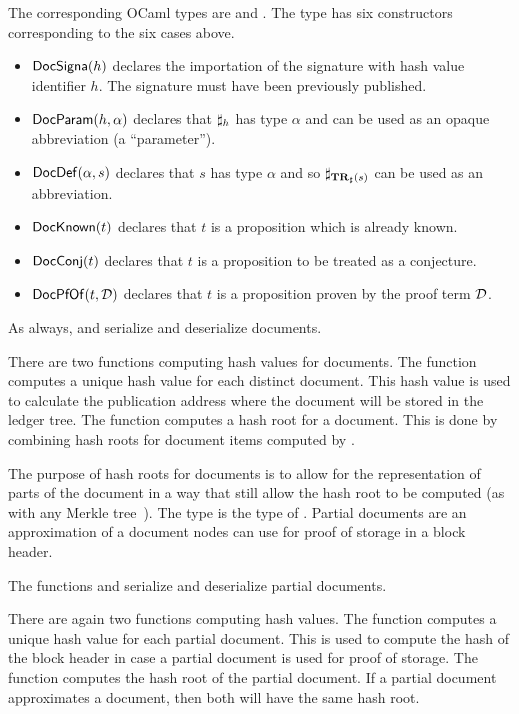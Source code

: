 The corresponding OCaml types are {} and {}.
The type {} has six constructors corresponding to the six cases above.
\begin{itemize}
\item $\mbox{\constr{DocSigna}}(h)$ declares the importation of the signature with hash value identifier $h$.
The signature must have been previously published.
\item $\mbox{\constr{DocParam}}(h,\alpha)$ declares that $\mathbf{\sharp}_{h}$ has type $\alpha$ and can be used
as an opaque abbreviation (a ``parameter'').
\item $\mbox{\constr{DocDef}}(\alpha,s)$ declares that $s$ has type $\alpha$ and so $\mathbf{\sharp}_{\mathbf{TR}_{\sharp}(s)}$ can
be used as an abbreviation.
\item $\mbox{\constr{DocKnown}}(t)$ declares that $t$ is a proposition which is already known.
\item $\mbox{\constr{DocConj}}(t)$ declares that $t$ is a proposition to be treated as a conjecture.
\item $\mbox{\constr{DocPfOf}}(t,\cD)$ declares that $t$ is a proposition proven by the proof term $\mathcal{D}$.
\end{itemize}

As always, {} and {} serialize and deserialize documents.

There are two functions computing hash values for documents.
The function
{}
computes a unique hash value for each distinct document.
This hash value is used to calculate the publication address where the document will be stored
in the ledger tree.
The function
{}
computes a hash root for a document.
This is done by combining hash roots for document items computed by {}.

The purpose of hash roots for documents is to allow for the representation of parts
of the document in a way that still allow the hash root to be computed (as with any Merkle tree~\cite{Merkle1980}).
The type {} is the type of {}.
Partial documents are an approximation of a document 
nodes can use for proof of storage in a block header.

The functions
{} and {} serialize and deserialize partial documents.

There are again two functions computing hash values.
The function {} computes a unique hash value for each partial document.
This is used to compute the hash of the block header in case a partial document
is used for proof of storage.
The function {} computes the hash root of the partial document.
If a partial document approximates a document, then both will have the same hash root.

